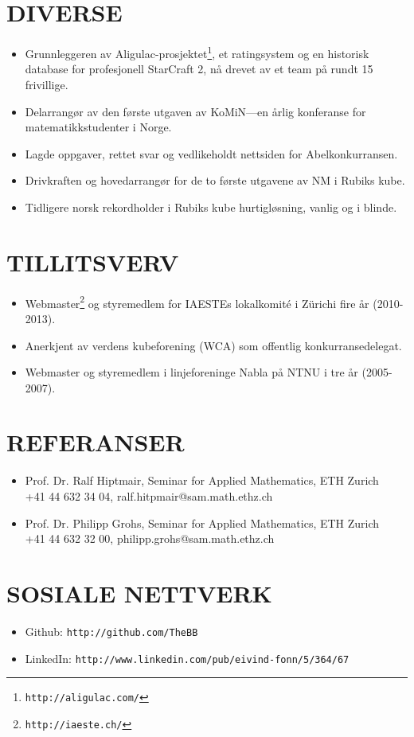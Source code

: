 \documentclass[line,margin]{res}
\newcommand{\zh}{Z\"{u}rich}
\begin{document}
\begin{resume}
\section{DIVERSE}
    \begin{itemize}
        \item Grunnleggeren av Aligulac-prosjektet\footnote{{\tt http://aligulac.com/}}, 
            et ratingsystem og en historisk database for profesjonell StarCraft 2, nå
            drevet av et team på rundt 15 frivillige.
        \item Delarrangør av den første utgaven av KoMiN---en årlig konferanse for
            matematikkstudenter i Norge.
        \item Lagde oppgaver, rettet svar og vedlikeholdt nettsiden for Abelkonkurransen.
        \item Drivkraften og hovedarrangør for de to første utgavene av NM i Rubiks kube.
        \item Tidligere norsk rekordholder i Rubiks kube hurtigløsning, vanlig og i blinde.
    \end{itemize}


\section{TILLITSVERV}
    \begin{itemize}
        \item Webmaster\footnote{{\tt http://iaeste.ch/}} og styremedlem for IAESTEs
            lokalkomité i \zh i fire år (2010-2013).
        \item Anerkjent av verdens kubeforening (WCA) som offentlig konkurransedelegat.
        \item Webmaster og styremedlem i linjeforeninge Nabla på NTNU i tre år
            (2005-2007).
    \end{itemize}


\section{REFERANSER}
    \begin{itemize}
        \item Prof. Dr. Ralf Hiptmair, Seminar for Applied Mathematics, ETH Zurich \\
            +41 44 632 34 04, ralf.hitpmair@sam.math.ethz.ch
        \item Prof. Dr. Philipp Grohs, Seminar for Applied Mathematics, ETH Zurich \\
            +41 44 632 32 00, philipp.grohs@sam.math.ethz.ch
    \end{itemize}


\section{SOSIALE NETTVERK}
    \begin{itemize}
        \item Github: \texttt{http://github.com/TheBB}
        \item LinkedIn: \texttt{http://www.linkedin.com/pub/eivind-fonn/5/364/67}
    \end{itemize}


\end{resume}
\end{document}
